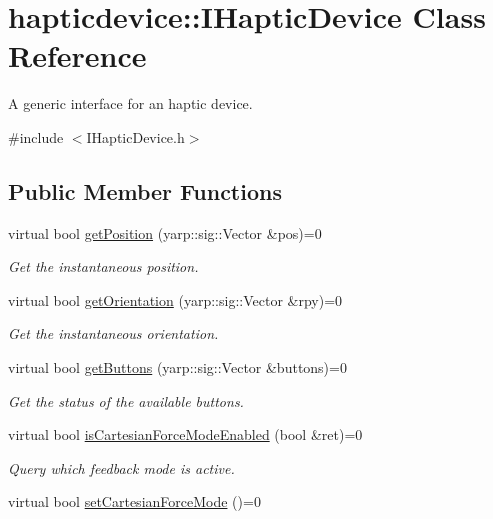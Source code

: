\section{hapticdevice\+:\+:I\+Haptic\+Device Class Reference}
\label{classhapticdevice_1_1IHapticDevice}


A generic interface for an haptic device.  




{\ttfamily \#include $<$I\+Haptic\+Device.\+h$>$}

\subsection*{Public Member Functions}
\begin{DoxyCompactItemize}
\item 
virtual bool \hyperlink{classhapticdevice_1_1IHapticDevice_a8c0b1835a1d7d501d1d4fa2efbd5ea26}{get\+Position} (yarp\+::sig\+::\+Vector \&pos)=0
\begin{DoxyCompactList}\small\item\em Get the instantaneous position. \end{DoxyCompactList}\item 
virtual bool \hyperlink{classhapticdevice_1_1IHapticDevice_a82f18c163da8ca50e564a29cf6b6f06e}{get\+Orientation} (yarp\+::sig\+::\+Vector \&rpy)=0
\begin{DoxyCompactList}\small\item\em Get the instantaneous orientation. \end{DoxyCompactList}\item 
virtual bool \hyperlink{classhapticdevice_1_1IHapticDevice_a83540a2fec263cb87628e9f521e89724}{get\+Buttons} (yarp\+::sig\+::\+Vector \&buttons)=0
\begin{DoxyCompactList}\small\item\em Get the status of the available buttons. \end{DoxyCompactList}\item 
virtual bool \hyperlink{classhapticdevice_1_1IHapticDevice_a1a6cbd5d7db5e36dbcd686b94a6b67ab}{is\+Cartesian\+Force\+Mode\+Enabled} (bool \&ret)=0
\begin{DoxyCompactList}\small\item\em Query which feedback mode is active. \end{DoxyCompactList}\item 
virtual bool \hyperlink{classhapticdevice_1_1IHapticDevice_a8b986f4c5d7bec42524c590c958ce37d}{set\+Cartesian\+Force\+Mode} ()=0

\end{DoxyCompactItemize}

